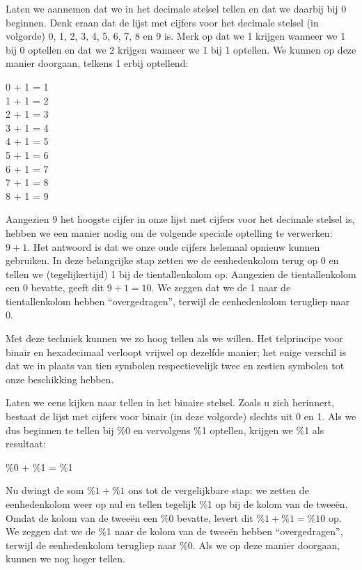 Laten we aannemen dat we in het decimale stelsel tellen en dat we daarbij bij 0 beginnen. Denk eraan dat de lijst met cijfers voor het decimale stelsel (in volgorde) 0, 1, 2, 3, 4, 5, 6, 7, 8 en 9 is. Merk op dat we 1 krijgen wanneer we 1 bij 0 optellen en dat we 2 krijgen wanneer we 1 bij 1 optellen. We kunnen op deze manier doorgaan, telkens 1 erbij optellend:
\begin{center}
	0 + 1 = 1  \\	1 + 1 = 2  \\	2 + 1 = 3  \\	3 + 1 = 4  \\	4 + 1 = 5  \\	5 + 1 = 6  \\	6 + 1 = 7  \\	7 + 1 = 8  \\	8 + 1 = 9  \\
\end{center}

Aangezien 9 het hoogste cijfer in onze lijst met cijfers voor het decimale stelsel is, hebben we een manier nodig om de volgende speciale optelling te verwerken: $9 + 1$. Het antwoord is dat we onze oude cijfers helemaal opnieuw kunnen gebruiken. In deze belangrijke stap zetten we de eenhedenkolom terug op 0 en tellen we (tegelijkertijd) 1 bij de tientallenkolom op. Aangezien de tientallenkolom een 0 bevatte, geeft dit $9 + 1 = 10$. We zeggen dat we de 1 naar de tientallenkolom hebben ``overgedragen'', terwijl de eenhedenkolom terugliep naar 0.

Met deze techniek kunnen we zo hoog tellen als we willen. Het telprincipe voor binair en hexadecimaal verloopt vrijwel op dezelfde manier; het enige verschil is dat we in plaats van tien symbolen respectievelijk twee en zestien symbolen tot onze beschikking hebben.

Laten we eens kijken naar tellen in het binaire stelsel. Zoals u zich herinnert, bestaat de lijst met cijfers voor binair (in deze volgorde) slechts uit 0 en 1. Als we dus beginnen te tellen bij \%0 en vervolgens \%1 optellen, krijgen we \%1 als resultaat:

\begin{center}
	\%0 + \%1 = \%1 \\
\end{center}

Nu dwingt de som $\%1 + \%1$ ons tot de vergelijkbare stap: we zetten de eenhedenkolom weer op nul en tellen tegelijk \%1 op bij de kolom van de tweeën. Omdat de kolom van de tweeën een \%0 bevatte, levert dit $\%1 + \%1 = \%10$ op. We zeggen dat we de \%1 naar de kolom van de tweeën hebben ``overgedragen'', terwijl de eenhedenkolom terugliep naar \%0. Als we op deze manier doorgaan, kunnen we nog hoger tellen.

